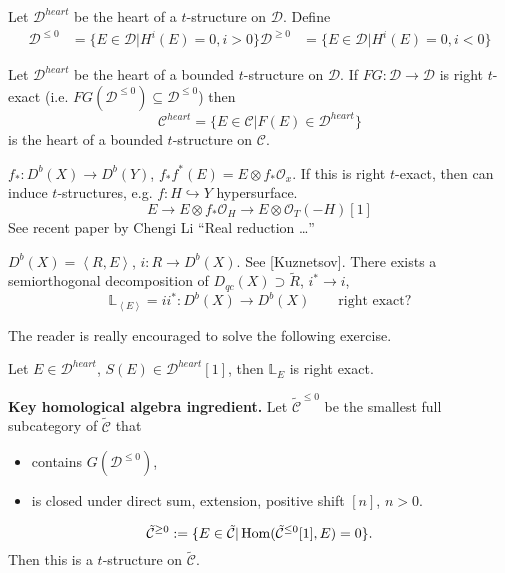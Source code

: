 \begin{definition}
\label{definition-vanishing-cohomologies-subcategories}
Let $\mathcal{D}^{heart}$ be the heart of a $t$-structure on $\mathcal{D}$.
Define
\begin{align*}
\mathcal{D}^{\leq 0}&=\{E \in \mathcal{D}|H^{i}(E)=0, i>0\}
\mathcal{D}^{\geq 0}&=\{E \in \mathcal{D}|H^{i}(E)=0, i<0\}
\end{align*}
\end{definition}

\begin{theorem}[Polischuk]
\label{theorem-Polischuk}
Let $\mathcal{D}^{heart}$ be the heart of a bounded $t$-structure on
$\mathcal{D}$. If $FG:\mathcal{D} \to \mathcal{D}$ is right $t$-exact 
(i.e. $FG(\mathcal{D}^{\leq 0})\subseteq \mathcal{D}^{\leq 0}$) 
then 
$$
\mathcal{C}^{heart}=\{E \in \mathcal{C}|F(E) \in \mathcal{D}^{heart}\}
$$
is the heart of a bounded $t$-structure on $\mathcal{C}$.
\end{theorem}

\begin{example}
\label{example-right}
$f_*:D^b(X) \to D^b(Y)$, $f_*f^*(E)=E\otimes f_*\mathcal{O}_x$. 
If this is right $t$-exact, then can induce $t$-structures, e.g. 
$f:H \hookrightarrow Y$ hypersurface.
$$
E \to E \otimes f_*\mathcal{O}_H\to E\otimes \mathcal{O}_T(-H)[1]
$$
See recent paper by Chengi Li ``Real reduction …''
\end{example}

\begin{example}
\label{example-Kuznetsov}
$D^b(X)=\left<R,E\right>$, $i:R \to D^b(X)$. See [Kuznetsov]. There exists a
semiorthogonal decomposition of $D_{qc}(X) \supset \tilde{R}$, $i^* \to i$,
$$
\mathbb{L}_{\left<E\right>}=ii^* :D^b(X) \to D^b(X)\qquad \text{right exact?}
$$
\end{example}

The reader is really encouraged to solve the following exercise.

\begin{exercise}
\label{exercise-right-exact}
Let $E \in \mathcal{D}^{heart}$, $S(E) \in \mathcal{D}^{heart}[1]$, then
$\mathbb{L}_E$ is right exact.
\end{exercise}

\noindent
{\bf Key homological algebra ingredient.} Let $\tilde{\mathcal{C}}^{\leq 0}$ 
be the smallest full subcategory of $\tilde{\mathcal{C}}$ that
\begin{itemize}
\item contains $G(\mathcal{D}^{\leq 0})$,
\item is closed under direct sum, extension, positive shift $[n]$, $n>0$.
\end{itemize}
$$
\tilde{\mathcal{C}}^{\geq 0}:=\{E \in \tilde{\mathcal{C}}|
\mathop{\mathrm{Hom}}\nolimits(\tilde{\mathcal{C}}^{\leq 0}[1],E)=0\}.
$$
Then this is a $t$-structure on $\tilde{\mathcal{C}}$.

